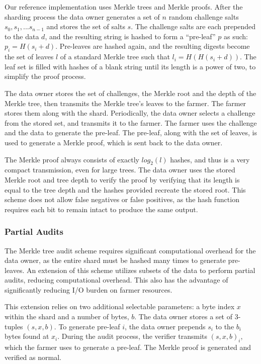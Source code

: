 \documentclass[a4paper,10pt]{article}
\begin{document}
Our reference implementation uses Merkle trees \cite{5} and Merkle proofs. After the sharding process the data owner generates a set of $ n $ random challenge salts $ s_{0}, s_{1}, ... s_{n-1} $ and stores the set of salts $ s $. The challenge salts are each prepended to the data $ d $, and the resulting string is hashed to form a “pre-leaf” $ p $ as such: $ p_{i} = H(s_{i} + d) $. Pre-leaves are hashed again, and the resulting digests become the set of leaves $ l $ of a standard Merkle tree such that $ l_{i} = H(H(s_{i} + d)) $. The leaf set is filled with hashes of a blank string until its length is a power of two, to simplify the proof process.


The data owner stores the set of challenges, the Merkle root and the depth of the Merkle tree, then transmits the Merkle tree’s leaves to the farmer. The farmer stores them along with the shard. Periodically, the data owner selects a challenge from the stored set, and transmits it to the farmer. The farmer uses the challenge and the data to generate the pre-leaf. The pre-leaf, along with the set of leaves, is used to generate a Merkle proof, which is sent back to the data owner.

The Merkle proof always consists of exactly $ log_{2}(l) $ hashes, and thus is a very compact transmission, even for large trees. The data owner uses the stored Merkle root and tree depth to verify the proof by verifying that its length is equal to the tree depth and the hashes provided recreate the stored root. This scheme does not allow false negatives or false positives, as the hash function requires each bit to remain intact to produce the same output.

\subsubsection{Partial Audits}
The Merkle tree audit scheme requires significant computational overhead for the data owner, as the entire shard must be hashed many times to generate pre-leaves. An extension of this scheme utilizes subsets of the data to perform partial audits, reducing computational overhead. This also has the advantage of significantly reducing I/O burden on farmer resources.

This extension relies on two additional selectable parameters: a byte index $ x $ within the shard and a number of bytes, $ b $. The data owner stores a set of 3-tuples $ (s, x, b) $. To generate pre-leaf $ i $, the data owner prepends $ s_{i} $ to the $ b_{i} $ bytes found at $ x_{i} $. During the audit process, the verifier transmits $ (s, x, b)_{i} $, which the farmer uses to generate a pre-leaf. The Merkle proof is generated and verified as normal.
\end{document}
